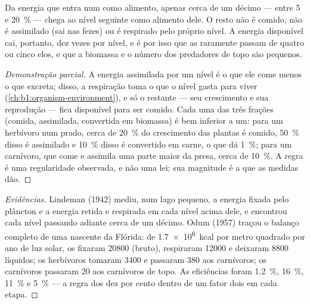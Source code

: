 \begin{theorem}\label{thm:b1:ecosystem-organization:lindeman}
Da energia que entra num  como alimento, apenas cerca de
um décimo --- entre \qty{5}{} e \qty{20}{\%} --- chega ao nível
seguinte como alimento dele. O resto não é comido, não é assimilado
(sai nas fezes) ou é respirado pelo próprio nível. A energia
disponível cai, portanto, dez vezes por nível, e é por isso que as
 raramente passam de quatro ou cinco elos, e que a
biomassa e o número dos predadores de topo são pequenos.
\end{theorem}
\begin{proof}[Demonstração parcial]
A energia assimilada por um nível é o que ele come menos o que
excreta; disso, a respiração toma o que o nível gasta para viver
(\cref{ch:b1:organism-environment}), e só o restante --- seu
crescimento e sua reprodução --- fica disponível para ser comido. Cada
uma das três frações (comida, assimilada, convertida em biomassa) é
bem inferior a um: para um herbívoro num prado, cerca de \qty{20}{\%}
do crescimento das plantas é comido, \qty{50}{\%} disso é assimilado e
\qty{10}{\%} disso é convertido em carne, o que dá \qty{1}{\%}; para
um carnívoro, que come e assimila uma parte maior da presa, cerca de
\qty{10}{\%}. A regra é uma regularidade observada, e não uma lei; sua
magnitude é a que as medidas dão.
\end{proof}
\begin{proof}[Evidências]
Lindeman (1942) mediu, num lago pequeno, a energia fixada pelo
plâncton e a energia retida e respirada em cada nível acima dele, e
encontrou cada nível passando adiante cerca de um décimo. Odum (1957)
traçou o balanço completo de uma nascente da Flórida: de
\qty{1.7e6}{kcal} por metro quadrado por ano de luz solar, os
 fixaram \num{20800} (bruto), respiraram \num{12000} e
deixaram \num{8800} líquidos; os herbívoros tomaram \num{3400} e
passaram \num{380} aos carnívoros; os carnívoros passaram \num{20} aos
carnívoros de topo. As eficiências foram \qty{1.2}{\%}, \qty{16}{\%},
\qty{11}{\%} e \qty{5}{\%} --- a regra dos dez por cento dentro de um
fator dois em cada etapa.
\end{proof}

